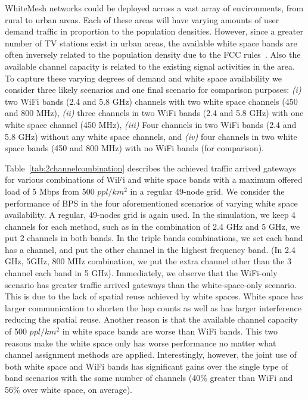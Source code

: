 WhiteMesh networks could be deployed across a vast array of environments, from
rural to urban areas. Each of these areas will have varying amounts of user
demand traffic in proportion to the population densities.  However, 
since a greater number of TV stations exist in urban areas, the available 
white space bands are often inversely related to the population density due to 
the FCC rules~\cite{fccwhitespace}. Also the available channel capacity is 
related to the existing signal activities in the area. To capture these varying
degrees of demand and white space availability we consider three likely scenarios
and one final scenario for comparison purposes: {\it (i)} two WiFi bands (2.4 and
5.8 GHz) channels with two white space channels (450 and 800 MHz), {\it (ii)} 
three channels in two WiFi bands (2.4 and 5.8 GHz) with one white space channel 
(450 MHz), {\it (iii)} Four channels in two WiFi bands (2.4 and 5.8 GHz) without 
any white space channels, and {\it (iv)} four channels in two white space bands 
(450 and 800 MHz) with no WiFi bands (for comparison).

Table~\ref{tab:2channelcombination} describes the achieved traffic arrived gateways 
for various combinations of WiFi and white space bands with a maximum offered load 
of 5 Mbps from 500 $ppl/km^2$ in a regular 49-node grid. We consider the performance 
of BPS in the four aforementioned scenarios of varying white space availability. A 
regular, 49-nodes grid is again used. In the simulation, we keep 4 channels for each
method, such as in the combination of 2.4 GHz and 5 GHz, we put 2 channels in both 
bands. In the triple bands combinations, we set each band has a channel, and put the 
other channel in the highest frequency band. (In 2.4 GHz, 5GHz, 800 MHz combination, 
we put the extra channel other than the 3 channel each band in 5 GHz). 
Immediately, we observe that the WiFi-only scenario has greater traffic arrived 
gateways than the white-space-only scenario. This is due to the lack of spatial 
reuse achieved by white spaces. White space has larger communication to shorten 
the hop counts as well as has larger interference reducing the spatial reuse. 
Another reason is that the available channel capacity of 500 $ppl/km^2$ in white 
space bands are worse than WiFi bands. This two reasons make the white space only 
has worse performance no matter what channel assignment methods are applied.
Interestingly, however, the joint use of both white space and WiFi bands has 
significant gains over the single type of band scenarios with the same number of 
channels (40\% greater than WiFi and 56\% over white space, on average). 

